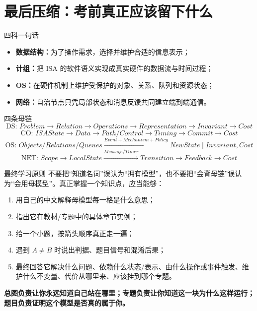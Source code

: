 \documentclass[11pt,a4paper,openany]{ctexbook}
\newcommand{\key}[1]{\textbf{\color{deep}#1}}
\begin{document}
\chapter{最后压缩：考前真正应该留下什么}

\begin{corebox}{四科一句话}
\begin{itemize}
  \item \key{数据结构：}为了操作需求，选择并维护合适的信息表示；
  \item \key{计组：}把 ISA 的软件语义实现成真实硬件的数据流与时间过程；
  \item \key{OS：}在硬件机制上维护受保护的对象、关系、队列和资源状态；
  \item \key{网络：}自治节点只凭局部状态和消息反馈共同建立端到端通信。
\end{itemize}
\end{corebox}

\begin{corebox}{四条母链}
\[
\text{DS: }Problem\rightarrow Relation\rightarrow Operations\rightarrow Representation\rightarrow Invariant\rightarrow Cost
\]
\[
\text{CO: }ISAState\rightarrow Data\rightarrow Path/Control\rightarrow Timing\rightarrow Commit\rightarrow Cost
\]
\[
\text{OS: }Objects/Relations/Queues\xrightarrow{Event+Mechanism+Policy}NewState\;|\;Invariant,Cost
\]
\[
\text{NET: }Scope\rightarrow LocalState\xrightarrow{Message/Timer}Transition\rightarrow Feedback\rightarrow Cost
\]
\end{corebox}

\begin{methodbox}{最终学习原则}
不要把“知道名词”误认为“拥有模型”，也不要把“会背母链”误认为“会用母模型”。真正掌握一个知识点，应当能够：
\begin{enumerate}
  \item 用自己的中文解释母模型每一格是什么意思；
  \item 指出它在教材/专题中的具体章节实例；
  \item 给一个小题，按箭头顺序真正走一遍；
  \item 遇到 $A\neq B$ 时说出判据、题目信号和混淆后果；
  \item 最终回答它解决什么问题、依赖什么状态/表示、由什么操作或事件触发、维护什么不变量、代价从哪里来、应该挂到哪个专题。
\end{enumerate}
\end{methodbox}

\begin{center}
\Large\bfseries\color{deep}
总图负责让你永远知道自己站在哪里；专题负责让你知道这一块为什么这样运行；题目负责证明这个模型是否真的属于你。
\end{center}
\end{document}
